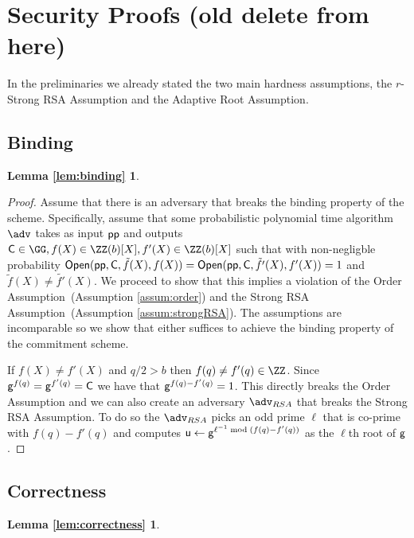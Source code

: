 \section{Security Proofs (old delete from here)}
\label{appendix:hardness}
In the preliminaries we already stated the two main hardness assumptions, the $r$-Strong RSA Assumption and the Adaptive Root Assumption.


\subsection{Binding}
\label{appendix:binding}
\newtheorem*{lemmabinding}{Lemma \ref{lem:binding}}
\begin{lemmabinding}
	\bindinglemma
\end{lemmabinding}
\begin{proof}
    Assume that there is an adversary that breaks the binding property of the scheme. Specifically, assume that some probabilistic polynomial time algorithm $\adv$ takes as input $\textsf{pp}$ and outputs $\gr{C} \in \GG, f(X) \in \ZZ(b)[X], f'(X)\in \ZZ(b)[X]$ such that with non-negligble probability $\textsf{{Open}}(\textsf{pp}, \mathsf{C}, \tilde{f}(X), f(X)) = \textsf{{Open}}(\textsf{pp}, \mathsf{C}, \tilde{f'}(X), f'(X)) = 1$ and $\tilde{f}(X) \neq \tilde{f'}(X)$. We proceed to show that this implies a violation of the Order Assumption~(Assumption \ref{assum:order}) and the Strong RSA Assumption~(Assumption \ref{assum:strongRSA}). The assumptions are incomparable so we show that either suffices to achieve the binding property of the commitment scheme.
    
	If $f(X)\neq f'(X)$ and $q/2>b$ then $f(q)\neq f'(q)\in \ZZ$. Since $\mathsf{g}^{f(q)}=\mathsf{g}^{f'(q)}=\mathsf{C}$ we have that $\mathsf{g}^{f(q)-f'(q)}=1$. This directly breaks the Order Assumption and we can also create an adversary $\adv_{RSA}$ that breaks the Strong RSA Assumption. To do so the $\adv_{RSA}$ picks an odd prime $\ell$ that is co-prime with $f(q)-f'(q)$ and computes $\mathsf{u}\gets \mathsf{g}^{\ell^{-1} \bmod (f(q)-f'(q))}$ as the $\ell$th root of $\mathsf{g}$.
\end{proof}

\subsection{Correctness}
\label{appendix:correctness}

\newtheorem*{lemmacorrectness}{Lemma \ref{lem:correctness}}
\begin{lemmacorrectness}
	\correctnesslemma
\end{lemmacorrectness}

